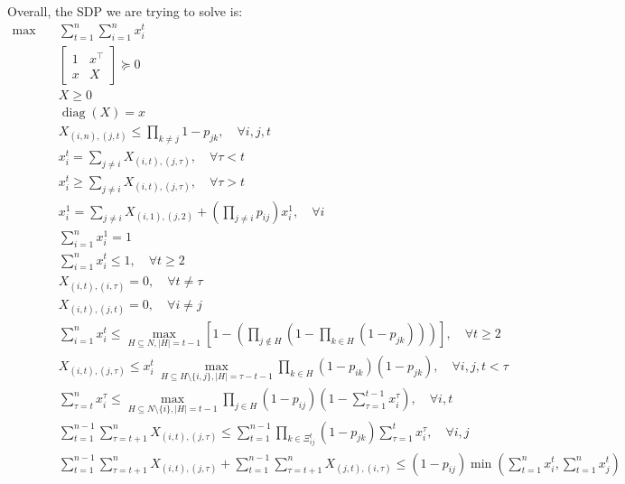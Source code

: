 \documentclass[10pt,leqno]{amsart}
\newcommand{\diag}{\operatorname{diag}}
\begin{document}
Overall, the SDP we are trying to solve is:
\begin{align*}
  \max\quad&\sum_{t=1}^{n}\sum_{i=1}^{n}x_i^t\\
  &\begin{bmatrix}
    1&x^\top \\
    x&X
  \end{bmatrix}\succeq 0\\
  &X\geq 0\\
  &\diag(X) = x\\
  &X_{(i,n),(j,t)}\leq \prod_{k\neq j}1-p_{jk},\quad\forall i,j,t\\
  &x_{i}^{t} = \sum_{j\neq i}X_{(i,t),(j,\tau)},\quad\forall \tau<t\\
  &x_{i}^{t} \geq \sum_{j\neq i}X_{(i,t),(j,\tau)},\quad\forall \tau>t\\
  &x_i^1 = \sum_{j\neq i}X_{(i,1),(j,2)} + \left(\prod_{j\neq i}p_{ij}\right)x_i^1,\quad \forall i\\
  &\sum_{i=1}^{n}x_i^1 = 1\\
  &\sum_{i=1}^{n}x_i^t \leq 1,\quad \forall t\geq 2\\
  & X_{(i,t),(i,\tau)} = 0,\quad\forall t\neq \tau\\
  & X_{(i,t),(j,t)} = 0,\quad\forall i\neq j\\
  &\sum_{i=1}^{n}x_i^t \leq \max_{H\subseteq N,|H|=t-1}\left[1-\left(\prod_{j\notin H}\left(1-\prod_{k\in H}(1-p_{jk})\right)\right)\right],\quad \forall t\geq 2\\ %
  &X_{(i,t),(j,\tau)}\leq x_i^t~\max_{H\subseteq H\setminus\{i,j\},|H|=\tau-t-1}\prod_{k\in H}(1-p_{ik})(1-p_{jk}),\quad\forall i,j,t<\tau\\
  &\sum_{\tau=t}^{n}x_i^\tau\leq \max_{H\subseteq N\setminus\{i\},|H|=t-1}\prod_{j\in H}(1-p_{ij})\left(1-\sum_{\tau=1}^{t-1}x_i^\tau\right),\quad \forall i,t\\
  &\sum_{t=1}^{n-1}\sum_{\tau=t+1}^{n}X_{(i,t),(j,\tau)}\leq \sum_{t=1}^{n-1}\prod_{k\in\Xi_{ij}^{t}}(1-p_{jk})\sum_{\tau=1}^{t}x_i^\tau,\quad\forall i,j\\ %
  &\sum_{t=1}^{n-1}\sum_{\tau=t+1}^{n}X_{(i,t),(j,\tau)}+\sum_{t=1}^{n-1}\sum_{\tau=t+1}^{n}X_{(j,t),(i,\tau)}\leq (1-p_{ij})\min\left(\sum_{t=1}^{n}x_i^t,\sum_{t=1}^{n}x_j^t\right)
\end{align*}
\end{document}
